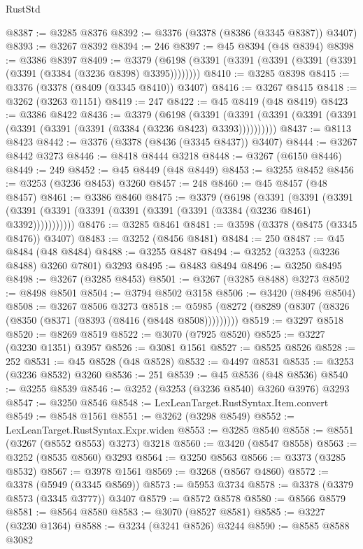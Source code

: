 \begin{lexlean}{RustStd}
\begin{coremodule}
{\begin{coremodule}
{{{{{{{{{{{{{{{{{{{{{{{{{{{{{{{{{{{{{{{@8387 := @3285 @8376
@8392 := @3376 (@3378 (@8386 (@3345 @8387)) @3407)
@8393 := @3267 @8392
@8394 := 246
@8397 := @45 @8394 (@48 @8394)
@8398 := @3386 @8397
@8409 := @3379 (@6198 (@3391 (@3391 (@3391 (@3391 (@3391 (@3391 (@3384 (@3236 @8398) @3395))))))))
@8410 := @3285 @8398
@8415 := @3376 (@3378 (@8409 (@3345 @8410)) @3407)
@8416 := @3267 @8415
@8418 := @3262 (@3263 @1151)
@8419 := 247
@8422 := @45 @8419 (@48 @8419)
@8423 := @3386 @8422
@8436 := @3379
    (@6198
      (@3391 (@3391 (@3391 (@3391 (@3391 (@3391 (@3391 (@3391 (@3384 (@3236 @8423) @3393))))))))))
@8437 := @8113 @8423
@8442 := @3376 (@3378 (@8436 (@3345 @8437)) @3407)
@8444 := @3267 @8442 @3273
@8446 := @8418 @8444 @3218
@8448 := @3267 (@6150 @8446)
@8449 := 249
@8452 := @45 @8449 (@48 @8449)
@8453 := @3255 @8452
@8456 := @3253 (@3236 @8453) @3260
@8457 := 248
@8460 := @45 @8457 (@48 @8457)
@8461 := @3386 @8460
@8475 := @3379
    (@6198
      (@3391
        (@3391
          (@3391 (@3391 (@3391 (@3391 (@3391 (@3391 (@3391 (@3384 (@3236 @8461) @3392)))))))))))
@8476 := @3285 @8461
@8481 := @3598 (@3378 (@8475 (@3345 @8476)) @3407)
@8483 := @3252 (@8456 @8481)
@8484 := 250
@8487 := @45 @8484 (@48 @8484)
@8488 := @3255 @8487
@8494 := @3252 (@3253 (@3236 @8488) @3260 @7801) @3293
@8495 := @8483 @8494
@8496 := @3250 @8495
@8498 := @3267 (@3285 @8453)
@8501 := @3267 (@3285 @8488) @3273
@8502 := @8498 @8501
@8504 := @3794 @8502 @3158
@8506 := @3420 (@8496 @8504)
@8508 := @3267 @8506 @3273
@8518 := @5985 (@8272 (@8289 (@8307 (@8326 (@8350 (@8371 (@8393 (@8416 (@8448 @8508)))))))))
@8519 := @3297 @8518
@8520 := @8269 @8519
@8522 := @3070 (@7925 @8520)
@8525 := @3227 (@3230 @1351) @3957
@8526 := @3081 @1561
@8527 := @8525 @8526
@8528 := 252
@8531 := @45 @8528 (@48 @8528)
@8532 := @4497 @8531
@8535 := @3253 (@3236 @8532) @3260
@8536 := 251
@8539 := @45 @8536 (@48 @8536)
@8540 := @3255 @8539
@8546 := @3252 (@3253 (@3236 @8540) @3260 @3976) @3293
@8547 := @3250 @8546
@8548 := LexLeanTarget.RustSyntax.Item.convert
@8549 := @8548 @1561
@8551 := @3262 (@3298 @8549)
@8552 := LexLeanTarget.RustSyntax.Expr.widen
@8553 := @3285 @8540
@8558 := @8551 (@3267 (@8552 @8553) @3273) @3218
@8560 := @3420 (@8547 @8558)
@8563 := @3252 (@8535 @8560) @3293
@8564 := @3250 @8563
@8566 := @3373 (@3285 @8532)
@8567 := @3978 @1561
@8569 := @3268 (@8567 @4860)
@8572 := @3378 (@5949 (@3345 @8569))
@8573 := @5953 @3734
@8578 := @3378 (@3379 @8573 (@3345 @3777)) @3407
@8579 := @8572 @8578
@8580 := @8566 @8579
@8581 := @8564 @8580
@8583 := @3070 (@8527 @8581)
@8585 := @3227 (@3230 @1364)
@8588 := @3234 (@3241 @8526) @3244
@8590 := @8585 @8588 @3082
}}}}}}}}}}}}}}}}}}}}}}}}}}}}}}}}}}}}}}}
\end{coremodule}}
\end{coremodule}
\end{lexlean}
